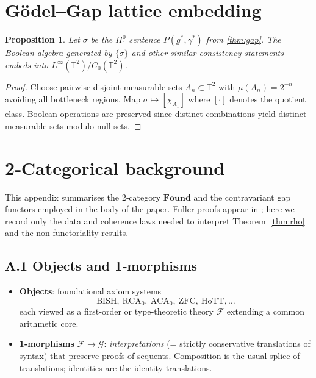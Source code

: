 \documentclass[11pt]{article}
\newtheorem{proposition}[theorem]{Proposition}
\theoremstyle{definition}\newtheorem{definition}[theorem]{Definition}
\theoremstyle{remark}\newtheorem{remark}[theorem]{Remark}
\newcommand{\Found}{\mathbf{Found}}
\begin{document}
\section{Gödel–Gap lattice embedding}\label{sec:lattice}

\begin{proposition}\label{prop:lattice}
Let $\sigma$ be the $\Pi^0_1$ sentence $P(g^\ast, \gamma^\ast)$ from \cref{thm:gap}. The Boolean algebra generated by $\{\sigma\}$ and other similar consistency statements embeds into $L^\infty(\mathbb T^2)/C_0(\mathbb T^2)$.
\end{proposition}

\begin{proof}
Choose pairwise disjoint measurable sets $A_n \subset \mathbb T^2$ with $\mu(A_n)=2^{-n}$ avoiding all bottleneck regions. Map $\sigma\mapsto[\chi_{A_1}]$ where $[\cdot]$ denotes the quotient class. Boolean operations are preserved since distinct combinations yield distinct measurable sets modulo null sets.
\end{proof}

\section{2‑Categorical background}
\label{app:found}

This appendix summarises the 2‑category \(\Found\) and the contravariant
gap functors employed in the body of the paper.  Fuller proofs appear in
\cite{Lee2025Framework}; here we record only the data and coherence laws
needed to interpret Theorem~\ref{thm:rho} and the non‑functoriality
results.

\subsection*{A.1 Objects and 1‑morphisms}
\begin{itemize}[leftmargin=2.1em,itemsep=0.3em]
\item \textbf{Objects}: foundational axiom systems
      \[
        \text{BISH},\ \text{RCA}_0,\ \text{ACA}_0,\ \text{ZFC},\ \text{HoTT},\ldots
      \]
      each viewed as a first‐order or type‑theoretic theory \(\mathcal F\)
      extending a common arithmetic core.
\item \textbf{1‑morphisms} \(\mathcal F\to\mathcal G\): \emph{interpretations}
      (= strictly conservative translations of syntax) that preserve
      proofs of sequents.  Composition is the usual splice of
      translations; identities are the identity translations.
\end{itemize}
\end{document}
